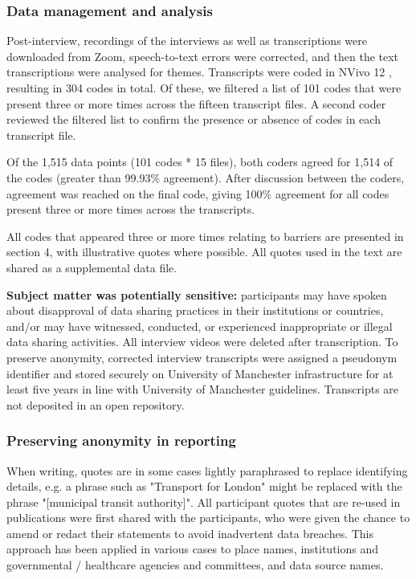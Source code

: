 \documentclass{CUP-JNL-DAP}%
\begin{document}
\subsubsection{Data management and analysis}
Post-interview, recordings of the interviews as well as transcriptions were downloaded from Zoom, speech-to-text errors were corrected, and then the text transcriptions were analysed for themes. Transcripts were coded in NVivo 12 \cite{qsr_international_pty_ltd_nvivo_2018}, resulting in 304 codes in total. Of these, we filtered a list of 101 codes that were present three or more times across the fifteen transcript files. A second coder reviewed the filtered list to confirm the presence or absence of codes in each transcript file. 

Of the 1,515 data points (101 codes * 15 files), both coders agreed for 1,514 of the codes (greater than 99.93\% agreement). After discussion between the coders, agreement was reached on the final code, giving 100\% agreement for all codes present three or more times across the transcripts. 

All codes that appeared three or more times relating to barriers are presented in section 4, with illustrative quotes where possible. All quotes used in the text are shared as a supplemental data file. 

\textbf{Subject matter was potentially sensitive:} participants may have spoken about disapproval of data sharing practices in their institutions or countries, and/or may have witnessed, conducted, or experienced inappropriate or illegal data sharing activities. All interview videos were deleted after transcription. To preserve anonymity, corrected interview transcripts were assigned a pseudonym identifier and stored securely on University of Manchester infrastructure for at least five years in line with University of Manchester guidelines. Transcripts are not deposited in an open repository. 

\subsubsection{Preserving anonymity in reporting}
When writing, quotes are in some cases lightly paraphrased to replace identifying details, e.g. a phrase such as "Transport for London" might be replaced with the phrase "[municipal transit authority]". All participant quotes that are re-used in publications were first shared with the participants, who were given the chance to amend or redact their statements to avoid inadvertent data breaches. This approach has been applied in various cases to place names, institutions and governmental / healthcare agencies and committees, and data source names. 
\end{document}
